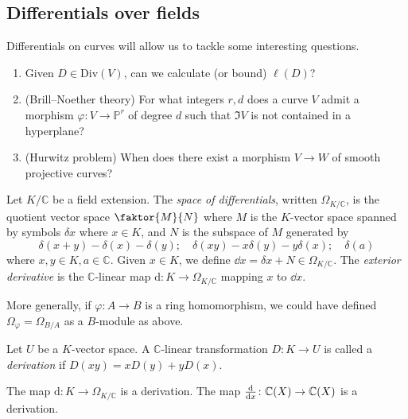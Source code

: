 \subsection{Differentials over fields}
Differentials on curves will allow us to tackle some interesting questions.
\begin{enumerate}
    \item Given \( D \in \mathrm{Div}(V) \), can we calculate (or bound) \( \ell(D) \)?
    \item (Brill--Noether theory) For what integers \( r, d \) does a curve \( V \) admit a morphism \( \varphi \colon V \to \mathbb P^r \) of degree \( d \) such that \( \Im V \) is not contained in a hyperplane?
    \item (Hurwitz problem) When does there exist a morphism \( V \to W \) of smooth projective curves?
\end{enumerate}
\begin{definition}
    Let \( K / \mathbb C \) be a field extension.
    The \emph{space of differentials}, written \( \Omega_{K/\mathbb C} \), is the quotient vector space \( \faktor{M}{N} \) where \( M \) is the \( K \)-vector space spanned by symbols \( \delta x \) where \( x \in K \), and \( N \) is the subspace of \( M \) generated by
    \[ \delta(x + y) - \delta(x) - \delta(y);\quad \delta(xy) - x\delta(y) - y\delta(x);\quad \delta(a) \]
    where \( x, y \in K, a \in \mathbb C \).
    Given \( x \in K \), we define \( \dd{x} = \delta x + N \in \Omega_{K/\mathbb C} \).
    The \emph{exterior derivative} is the \( \mathbb C \)-linear map \( \mathrm{d} \colon K \to \Omega_{K/\mathbb C} \) mapping \( x \) to \( \dd{x} \).
\end{definition}
\begin{remark}
    More generally, if \( \varphi \colon A \to B \) is a ring homomorphism, we could have defined \( \Omega_\varphi = \Omega_{B/A} \) as a \( B \)-module as above.
\end{remark}
\begin{definition}
    Let \( U \) be a \( K \)-vector space.
    A \( \mathbb C \)-linear transformation \( D \colon K \to U \) is called a \emph{derivation} if \( D(xy) = xD(y) + yD(x) \).
\end{definition}
\begin{example}
    The map \( \mathrm{d} \colon K \to \Omega_{K/\mathbb C} \) is a derivation.
    The map \( \dv{x} \colon \mathbb C(X) \to \mathbb C(X) \) is a derivation.
\end{example}
